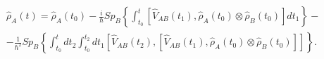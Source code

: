 \begin{eqnarray}
\hat{\rho}_{A}\left(t\right) = 
\hat{\rho}_{A}\left(t_0\right) - \frac{i}{\hbar} Sp_B \left\{
\int_{t_0}^{t} 
\left[\hat{V}_{AB}\left(t_1\right), \hat{\rho}_{A}\left(t_0\right)
\otimes
\hat{\rho}_{B}\left(t_0\right)
\right]d t_1
\right\} -
\nonumber \\
-
\frac{1}{\hbar^2}
Sp_B \left\{
\int_{t_0}^{t}d t_2 
\int_{t_0}^{t_2} d t_1
\left[\hat{V}_{AB}\left(t_2\right), 
\left[\hat{V}_{AB}\left(t_1\right), 
\hat{\rho}_{A}\left(t_0\right)
\otimes
\hat{\rho}_{B}\left(t_0\right)
\right]
\right]
\right\}.
\nonumber
\end{eqnarray}